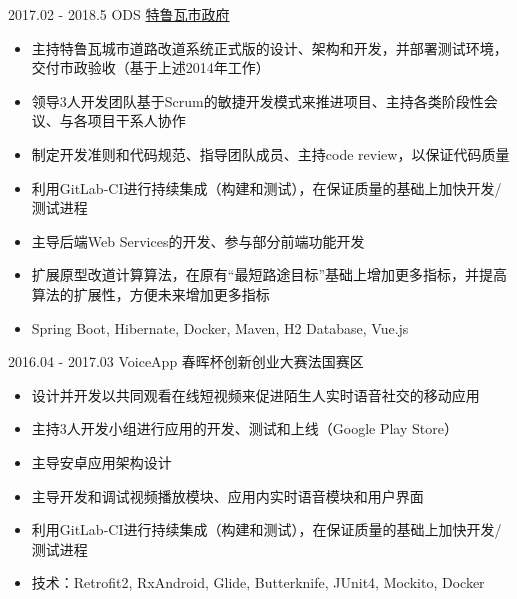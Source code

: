 \documentclass[letterpaper]{twentysecondcv} %
\begin{document}
\begin{twentyfluid}

    \twentyitemfluid
   		{2017.02 - 2018.5}
        {ODS}
        {\href{https://www.ville-troyes.fr/}{特鲁瓦市政府}}
        {\\   }
        {
        {
        \vspace{-0.2cm}
        \begin{itemize}
        	\item 主持特鲁瓦城市道路改道系统正式版的设计、架构和开发，并部署测试环境，交付市政验收（基于上述2014年工作）
        	\item 领导3人开发团队基于Scrum的敏捷开发模式来推进项目、主持各类阶段性会议、与各项目干系人协作
        	\item 制定开发准则和代码规范、指导团队成员、主持code review，以保证代码质量
        	\item 利用GitLab-CI进行持续集成（构建和测试），在保证质量的基础上加快开发/测试进程
            \item 主导后端Web Services的开发、参与部分前端功能开发
            \item 扩展原型改道计算算法，在原有``最短路途目标''基础上增加更多指标，并提高算法的扩展性，方便未来增加更多指标
        	\item Spring Boot, Hibernate, Docker, Maven, H2 Database, Vue.js
    	\end{itemize}}
        }
    
    \twentyitemfluid
    	{2016.04 - 2017.03}
        {VoiceApp}
        {春晖杯创新创业大赛法国赛区}
        {\\   }
        {
        {
        \vspace{-0.2cm}
        \begin{itemize}
        	\item 设计并开发以共同观看在线短视频来促进陌生人实时语音社交的移动应用
            \item 主持3人开发小组进行应用的开发、测试和上线（Google Play Store）
            \item 主导安卓应用架构设计
            \item 主导开发和调试视频播放模块、应用内实时语音模块和用户界面
            \item 利用GitLab-CI进行持续集成（构建和测试），在保证质量的基础上加快开发/测试进程
            \item 技术：Retrofit2, RxAndroid, Glide, Butterknife, JUnit4, Mockito, Docker
        \end{itemize}}
        }

\end{twentyfluid}
\end{document}
